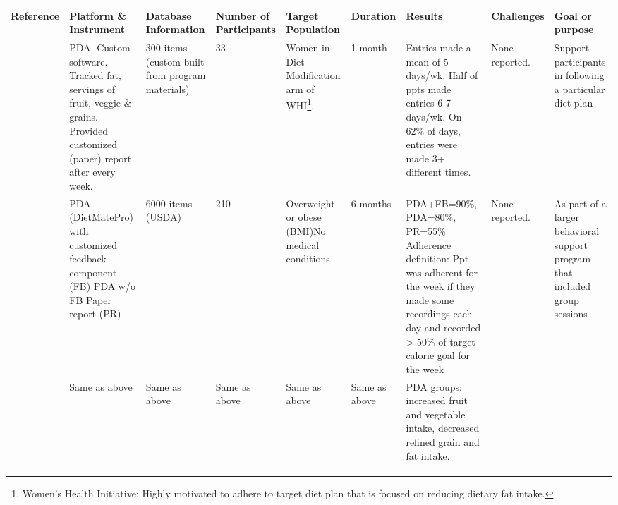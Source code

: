 

\begin{landscape}
\tiny
  \centering
    
\begin{longtable}{l
p{1in}
p{0.5in}
p{0.35in}
p{1in}
p{0.35in}
p{1in}
p{1in}
p{1in}}

       \toprule
    \bf{Reference} & \bf{Platform \& Instrument } & \bf{Database Information } & \bf{Number of Participants } & \bf{Target Population } & \bf{Duration } & \bf{Results } & \bf{Challenges } & \bf{Goal or purpose} \\
    \midrule \endhead
\cite{glanz_improving_2006} & 
PDA. \newline
Custom software. \newline 
Tracked fat, servings of fruit, veggie \& grains. Provided customized (paper) report after every week. & 
300 items (custom built from program materials) & 
33    & 
Women in Diet Modification arm of WHI\footnote{Women's Health Initiative: Highly motivated to adhere to target diet plan that is focused on reducing dietary fat intake.}. & 
1 month & 
Entries made a mean of 5 days/wk. \newline 
Half of ppts made entries 6-7 days/wk. \newline 
On 62\% of days, entries were made 3+ different times. &       
None reported.& 
Support participants in following a particular diet plan \\
\cite{burke_effect_2011} &
PDA (DietMatePro) with customized feedback component (FB)\newline
PDA w/o FB\newline
Paper report (PR)\newline &
6000 items (USDA) &
210   &
Overweight or obese (BMI)\newline No medical conditions &
6 months & 
PDA+FB=90\%, PDA=80\%, PR=55\% \newline
Adherence definition: Ppt was adherent for the week if they made some recordings each day and recorded > 50\% of target calorie goal for the week &
None reported. &
As part of a larger behavioral support program that included group sessions   \\
\cite{acharya_using_2011} & Same as above & Same as above  & Same as above   & Same as above & Same as above &
PDA groups: increased fruit and vegetable intake, decreased refined grain and fat intake. \newline

\end{longtable}
\end{landscape}
